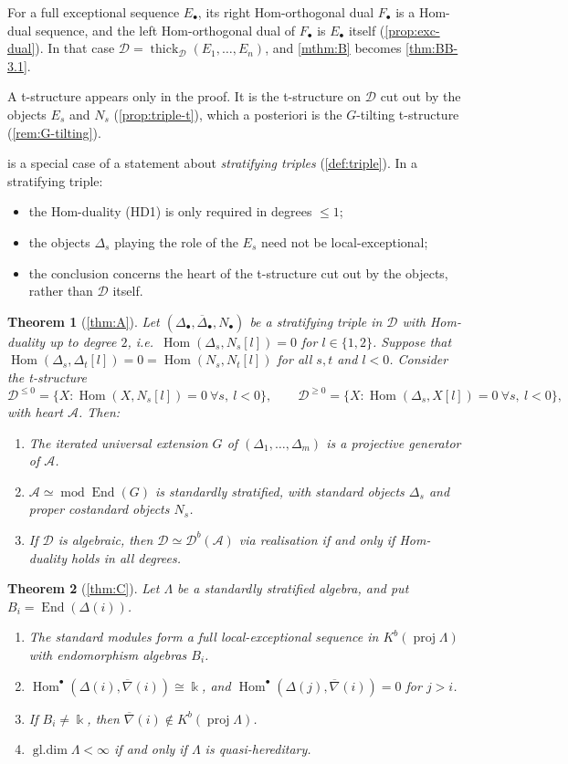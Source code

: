 \documentclass[11pt,reqno]{amsart}
\theoremstyle{plain}
\newtheorem{maintheoreminner}{Theorem}
\newenvironment{maintheorem}[1]{\renewcommand{\themaintheoreminner}{#1}\begin{maintheoreminner}}{\end{maintheoreminner}}
\theoremstyle{definition}
\theoremstyle{remark}
\newcommand{\kk}{\Bbbk}
\DeclareMathOperator{\Hom}{Hom}
\DeclareMathOperator{\End}{End}
\DeclareMathOperator{\gldim}{gl.dim}
\newcommand{\modd}{\operatorname{mod}}
\newcommand{\proj}{\operatorname{proj}}
\newcommand{\Db}{\mathcal{D}^b}
\newcommand{\Kb}{K^b}
\newcommand{\thick}[2][\cD]{\operatorname{thick}_{#1}(#2)}
\newcommand{\nablabar}{\overline{\nabla}}
\newcommand{\Deltabar}{\overline{\Delta}}
\newcommand{\cD}{\mathcal{D}}
\newcommand{\cA}{\mathcal{A}}
\begin{document}
For a full exceptional sequence $E_\bullet$, its right Hom-orthogonal dual $F_\bullet$ is a Hom-dual sequence, and the left Hom-orthogonal dual of $F_\bullet$ is $E_\bullet$ itself (\cref{prop:exc-dual}). In that case $\cD=\thick{E_1,\dots,E_n}$, and \cref{mthm:B} becomes \cref{thm:BB-3.1}.

A t-structure appears only in the proof. It is the t-structure on $\cD$ cut out by the objects $E_s$ and $N_s$ (\cref{prop:triple-t}), which a posteriori is the $G$-tilting t-structure (\cref{rem:G-tilting}).

 is a special case of a statement about \emph{stratifying triples} (\cref{def:triple}). In a stratifying triple:
\begin{itemize}
\item the Hom-duality (HD1) is only required in degrees $\le1$;
\item the objects $\Delta_s$ playing the role of the $E_s$ need not be local-exceptional;
\item the conclusion concerns the heart of the t-structure cut out by the objects, rather than $\cD$ itself.
\end{itemize}

\begin{maintheorem}{A}[\cref{thm:A}]\label{mthm:A}
Let $(\Delta_\bullet,\Deltabar_\bullet,N_\bullet)$ be a stratifying triple in $\cD$ with Hom-duality up to degree $2$, i.e.\ $\Hom(\Delta_s,N_s[l])=0$ for $l\in\{1,2\}$. Suppose that $\Hom(\Delta_s,\Delta_t[l])=0=\Hom(N_s,N_t[l])$ for all $s,t$ and $l<0$. Consider the t-structure
\[\cD^{\le0}=\{X:\Hom(X,N_s[l])=0\ \forall s,\ l<0\},\qquad\cD^{\ge0}=\{X:\Hom(\Delta_s,X[l])=0\ \forall s,\ l<0\},\]
with heart $\cA$. Then:
\begin{enumerate}
\item The iterated universal extension $G$ of $(\Delta_1,\dots,\Delta_m)$ is a projective generator of $\cA$.
\item $\cA\simeq\modd\End(G)$ is standardly stratified, with standard objects $\Delta_s$ and proper costandard objects $N_s$.
\item If $\cD$ is algebraic, then $\cD\simeq\Db(\cA)$ via realisation if and only if Hom-duality holds in all degrees.
\end{enumerate}
\end{maintheorem}

\begin{maintheorem}{C}[\cref{thm:C}]\label{mthm:C}
Let $\Lambda$ be a standardly stratified algebra, and put $B_i=\End(\Delta(i))$.
\begin{enumerate}
\item The standard modules form a full local-exceptional sequence in $\Kb(\proj\Lambda)$ with endomorphism algebras $B_i$.
\item $\Hom^\bullet(\Delta(i),\nablabar(i))\cong\kk$, and $\Hom^\bullet(\Delta(j),\nablabar(i))=0$ for $j>i$.
\item If $B_i\neq\kk$, then $\nablabar(i)\notin\Kb(\proj\Lambda)$.
\item $\gldim\Lambda<\infty$ if and only if $\Lambda$ is quasi-hereditary.
\end{enumerate}
\end{maintheorem}
\end{document}
